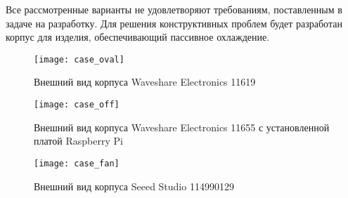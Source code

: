 Все рассмотренные варианты не удовлетворяют требованиям, поставленным в задаче на
разработку. Для решения конструктивных проблем будет разработан корпус для изделия,
обеспечивающий пассивное охлаждение.

\begin{figure}[h]
    \center
    \texttt{[image: case\_oval]}
    \caption{Внешний вид корпуса Waveshare Electronics 11619}
    \label{pic:case_oval}
\end{figure}

\begin{figure}[h]
    \center
    \texttt{[image: case\_off]}
    \caption{Внешний вид корпуса Waveshare Electronics 11655 с установленной платой
    Raspberry Pi}
    \label{pic:case_off}
\end{figure}

\begin{figure}[h]
    \center
    \texttt{[image: case\_fan]}
    \caption{Внешний вид корпуса Seeed Studio 114990129}
    \label{pic:case_fan}
\end{figure}
